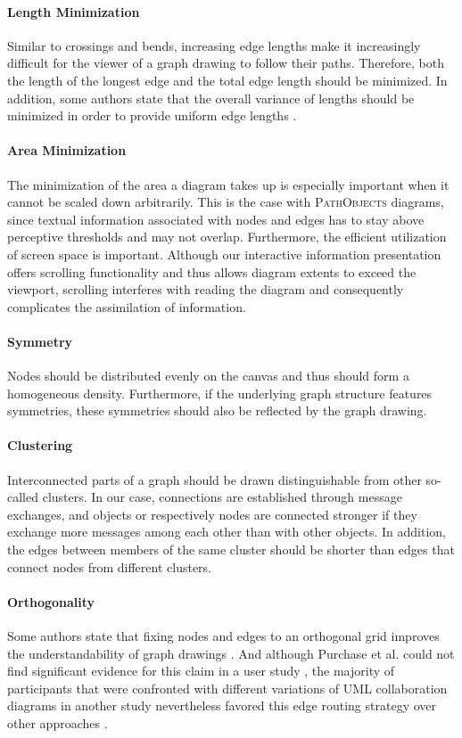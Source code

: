 \paragraph{Length Minimization} Similar to crossings and bends, increasing edge lengths make it increasingly difficult for the viewer of a graph drawing to follow their paths.
Therefore, both the length of the longest edge and the total edge length should be minimized.
In addition, some authors state that the overall variance of lengths should be minimized in order to provide uniform edge lengths \cite{battista_graph_1998, kaufmann_drawing_2001}.

\paragraph{Area Minimization} The minimization of the area a diagram takes up is especially important when it cannot be scaled down arbitrarily.
This is the case with \textsc{PathObjects} diagrams, since textual information associated with nodes and edges has to stay above perceptive thresholds and may not overlap.
Furthermore, the efficient utilization of screen space is important.
Although our interactive information presentation offers scrolling functionality and thus allows diagram extents to exceed the viewport, scrolling interferes with reading the diagram and consequently complicates the assimilation of information.

\paragraph{Symmetry} Nodes should be distributed evenly on the canvas and thus should form a homogeneous density.
Furthermore, if the underlying graph structure features symmetries, these symmetries should also be reflected by the graph drawing.

\paragraph{Clustering} Interconnected parts of a graph should be drawn distinguishable from other so-called clusters.
In our case, connections are established through message exchanges, and objects or respectively nodes are connected stronger if they exchange more messages among each other than with other objects.
In addition, the edges between members of the same cluster should be shorter than edges that connect nodes from different clusters.

\paragraph{Orthogonality} Some authors state that fixing nodes and edges to an orthogonal grid improves the understandability of graph drawings \cite{sugiyama_methods_1981, batini_what_1985}.
And although Purchase et al. could not find significant evidence for this claim in a user study \cite{purchase_which_1997}, the majority of participants that were confronted with different variations of UML collaboration diagrams in another study nevertheless favored this edge routing strategy over other approaches \cite{purchase_graph_2004}.
